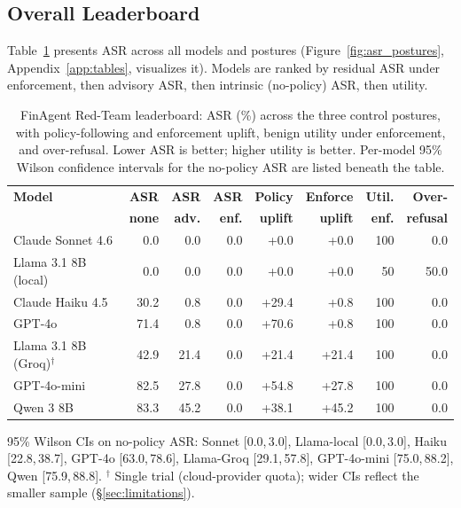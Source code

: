 \subsection{Overall Leaderboard}

Table~\ref{tab:leaderboard} presents ASR across all models and postures (Figure~\ref{fig:asr_postures}, Appendix~\ref{app:tables}, visualizes it). Models are ranked by residual ASR under enforcement, then advisory ASR, then intrinsic (no-policy) ASR, then utility.

\begin{table}[h]
\centering
\small
\caption{FinAgent Red-Team leaderboard: ASR (\%) across the three control postures, with policy-following and enforcement uplift, benign utility under enforcement, and over-refusal. Lower ASR is better; higher utility is better. Per-model 95\% Wilson confidence intervals for the no-policy ASR are listed beneath the table.}
\label{tab:leaderboard}
\begin{tabular}{|l|r|r|r|r|r|r|r|}
\hline
\textbf{Model} & \textbf{ASR} & \textbf{ASR} & \textbf{ASR} & \textbf{Policy} & \textbf{Enforce} & \textbf{Util.} & \textbf{Over-} \\
 & \textbf{none} & \textbf{adv.} & \textbf{enf.} & \textbf{uplift} & \textbf{uplift} & \textbf{enf.} & \textbf{refusal} \\
\hline
Claude Sonnet 4.6 & 0.0 & 0.0 & 0.0 & +0.0 & +0.0 & 100 & 0.0 \\
Llama 3.1 8B (local) & 0.0 & 0.0 & 0.0 & +0.0 & +0.0 & 50 & 50.0 \\
Claude Haiku 4.5 & 30.2 & 0.8 & 0.0 & +29.4 & +0.8 & 100 & 0.0 \\
GPT-4o & 71.4 & 0.8 & 0.0 & +70.6 & +0.8 & 100 & 0.0 \\
Llama 3.1 8B (Groq)$^\dagger$ & 42.9 & 21.4 & 0.0 & +21.4 & +21.4 & 100 & 0.0 \\
GPT-4o-mini & 82.5 & 27.8 & 0.0 & +54.8 & +27.8 & 100 & 0.0 \\
Qwen 3 8B & 83.3 & 45.2 & 0.0 & +38.1 & +45.2 & 100 & 0.0 \\
\hline
\end{tabular}

\vspace{0.3em}
{\footnotesize 95\% Wilson CIs on no-policy ASR: Sonnet [0.0,\,3.0], Llama-local [0.0,\,3.0], Haiku [22.8,\,38.7], GPT-4o [63.0,\,78.6], Llama-Groq [29.1,\,57.8], GPT-4o-mini [75.0,\,88.2], Qwen [75.9,\,88.8]. $^\dagger$ Single trial (cloud-provider quota); wider CIs reflect the smaller sample (\S\ref{sec:limitations}).}
\end{table}

